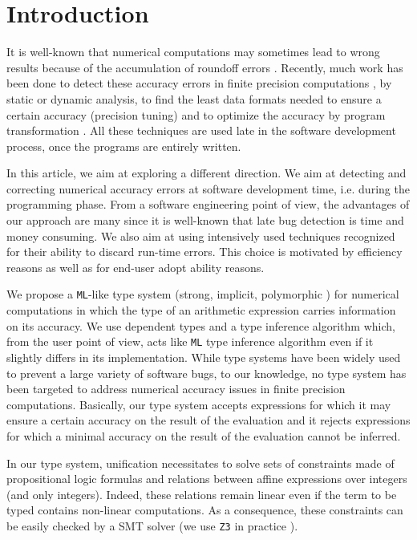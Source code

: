 

\section{Introduction}

It is well-known that numerical computations may sometimes lead to wrong results because of the accumulation of 
roundoff errors \cite{Fral17}. 
Recently, much work has been done to detect these accuracy errors in finite precision computations \cite{IEEE754}, by  static \cite{DK14,Gou13,Sal15} or dynamic 
\cite{Dal16} analysis, to find the least
data formats needed to ensure a certain accuracy (precision tuning) \cite{Lal13,Mar17,Ral13} and to optimize the accuracy by program transformation \cite{DMC15,Pal15}.
All these techniques are used late in the software development process, once the programs are entirely written.

In this article, we aim at exploring a different direction. We aim at detecting and correcting numerical accuracy errors at software development time, i.e. during the 
programming phase. From a software engineering point of view, the advantages of our approach are many since it is well-known that late bug detection is time and money 
consuming. We also aim at using intensively used techniques recognized for their ability to discard run-time errors. This choice is motivated by efficiency reasons as well as 
for end-user adopt ability reasons.

We propose a \texttt{ML}-like type system (strong, implicit, polymorphic \cite{Pie02}) for numerical computations in which the type of an 
arithmetic expression carries information on its accuracy. We  use dependent types \cite{Pie04} and a type inference algorithm which, from the user point of view, 
acts like \texttt{ML} \cite{Mal97}  type inference algorithm \cite{Pie02} even if it slightly differs in its implementation. While type systems have been widely
used to prevent a large variety of software bugs, to our knowledge, no type system has been targeted to address numerical accuracy issues in finite precision computations.
Basically, our type system accepts expressions for which it may ensure a certain accuracy on the result of the evaluation and it rejects expressions for which a minimal 
 accuracy on the result of the evaluation cannot be inferred.

In our type system, unification necessitates to solve sets
of constraints made of propositional logic formulas and relations between affine expressions over integers 
(and only integers).
Indeed, these relations remain linear even if the term to be typed contains non-linear computations.
As a consequence, these constraints can be easily checked by a SMT solver 
(we use \texttt{Z3} in practice \cite{Mou08}). 


